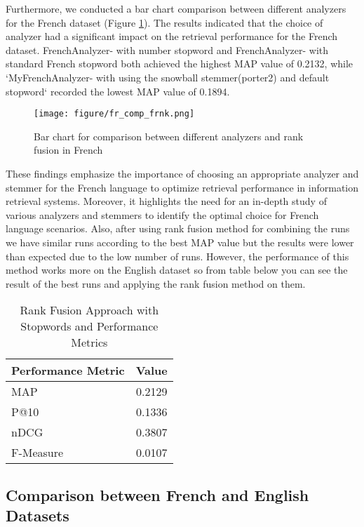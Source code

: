 Furthermore, we conducted a bar chart comparison between different analyzers for the French dataset (Figure \ref{fig:FR_measure}). The results indicated that the choice of analyzer had a significant impact on the retrieval performance for the French dataset. FrenchAnalyzer- with number stopword and FrenchAnalyzer- with standard French stopword both achieved the highest MAP value of 0.2132, while `MyFrenchAnalyzer- with using the snowball stemmer(porter2) and default stopword` recorded the lowest MAP value of 0.1894.

\begin{figure}
  \centering
  \texttt{[image: figure/fr\_comp\_frnk.png]}
  \caption{\centering Bar chart for comparison between different analyzers and rank fusion in French }
  \label{fig:FR_measure}
\end{figure}

These findings emphasize the importance of choosing an appropriate analyzer and stemmer for the French language to optimize retrieval performance in information retrieval systems. Moreover, it highlights the need for an in-depth study of various analyzers and stemmers to identify the optimal choice for French language scenarios. Also, after using rank fusion method for combining the runs we have similar runs according to the best MAP value but the results were lower than expected due to the low number of runs. However, the performance of this method works more on the English dataset so from table below you can see the result of the best runs and applying the rank fusion method on them.

\begin{table}[h]
\centering
\caption{Rank Fusion Approach with Stopwords and Performance Metrics}
\begin{tabular}{|l|c|}
\hline
\textbf{Performance Metric} & \textbf{Value} \\
\hline
MAP & 0.2129 \\
P@10 & 0.1336 \\
nDCG & 0.3807 \\
F-Measure & 0.0107 \\
\hline
\end{tabular}
\end{table}


\subsection{Comparison between French and English Datasets}


